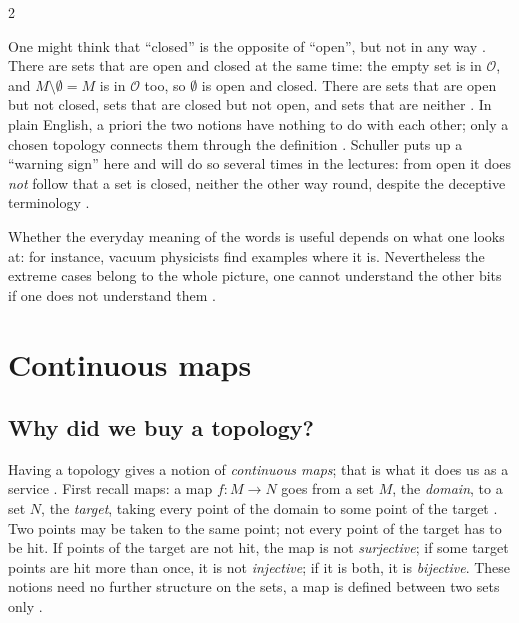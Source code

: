\begin{paracol}{2}
\begin{remark}\label{rem:c01-warning}
One might think that ``closed'' is the opposite of ``open'', but not in any way . There are sets that are
open and closed at the same time: the empty set is in $\mathcal O$, and $M\setminus\emptyset=M$ is in $\mathcal O$ too, so $\emptyset$ is open
and closed. There are sets that are open but not closed, sets that are closed but not open, and sets that are neither
. In plain English, a priori the two notions have nothing to do with each other; only a
chosen topology connects them through the definition . Schuller puts up a ``warning sign'' here and will do so
several times in the lectures: from open it does \emph{not} follow that a set is closed, neither the other way round, despite the
deceptive terminology .
\end{remark}
\begin{aside}
Whether the everyday meaning of the words is useful depends on what one looks at: for instance, vacuum physicists find examples
where it is. Nevertheless the extreme cases belong to the whole picture, one cannot understand the other bits if one does not
understand them .
\end{aside}

\section{Continuous maps}\label{sec:c01-continuity}

\subsection{Why did we buy a topology?}

Having a topology gives a notion of \emph{continuous maps}; that is what it does us as a service .
First recall maps: a map $f\colon M\to N$ goes from a set $M$, the \emph{domain}, to a set $N$, the \emph{target}, taking every point of
the domain to some point of the target . Two points may be taken to the same point; not every
point of the target has to be hit. If points of the target are not hit, the map is not \emph{surjective}; if some target points are hit
more than once, it is not \emph{injective}; if it is both, it is \emph{bijective}. These notions need no further structure on the
sets, a map is defined between two sets only .


\end{paracol}
